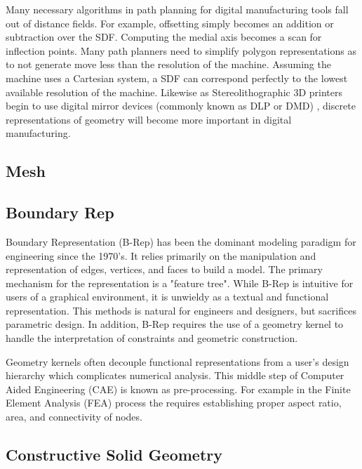 \documentclass[a4paper]{article}
\begin{document}
Many necessary algorithms in path planning for digital manufacturing tools
fall out of distance fields. For example, offsetting simply becomes
an addition or subtraction over the SDF. Computing the medial axis becomes
a scan for inflection points. Many path planners need to simplify polygon
representations as to not generate move less than the resolution of the machine.
Assuming the machine uses a Cartesian system, a SDF can correspond perfectly
to the lowest available resolution of the machine.
Likewise as Stereolithographic 3D printers
begin to use digital mirror devices (commonly known as DLP or DMD)
, discrete representations of geometry will become more important in
digital manufacturing.


\subsection{Mesh}

\cite{Heckbert_Garland_1997}

\cite{Bischoff_Botsch_Steinberg_Bischoff_Kobbelt_Aachen_2002}

\subsection{Boundary Rep}
Boundary Representation (B-Rep) has been the dominant modeling paradigm
for engineering since the 1970's.
It relies primarily on the manipulation and representation of
edges, vertices, and faces to build a model.
The primary mechanism for the representation is a "feature tree".
While B-Rep is intuitive for users of a graphical environment,
it is unwieldy as a textual and functional representation.
This methods is natural for engineers and designers, but sacrifices
parametric design. In addition, B-Rep requires the use of a geometry kernel
to handle the interpretation of constraints and geometric construction. \cite{stroud2006boundary}

Geometry kernels often decouple functional representations from a user's design
hierarchy which complicates numerical analysis.\cite{lee2005cad}
This middle step of Computer Aided Engineering (CAE) is known as pre-processing.
For example in the Finite Element Analysis (FEA) process the requires
establishing proper aspect ratio, area, and connectivity of nodes.


\subsection{Constructive Solid Geometry}
\end{document}
